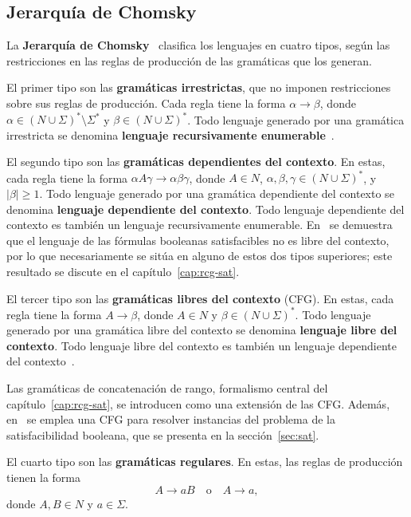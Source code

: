 \subsection{Jerarquía de Chomsky}

La \textbf{Jerarquía de Chomsky}~\cite{hunter2020chomsky} clasifica los
lenguajes en cuatro tipos, según las restricciones en las reglas de
producción de las gramáticas que los generan.

El primer tipo son las \textbf{gramáticas irrestrictas}, que no imponen
restricciones sobre sus reglas de producción. Cada regla tiene la forma
$\alpha \to \beta$, donde $\alpha \in (N \cup \Sigma)^* \setminus \Sigma^*$
y $\beta \in (N \cup \Sigma)^*$. Todo lenguaje generado por una gramática
irrestricta se denomina \textbf{lenguaje recursivamente
enumerable}~\cite{hopcroft2006introduction}.

El segundo tipo son las \textbf{gramáticas dependientes del contexto}.
En estas, cada regla tiene la forma $\alpha A \gamma \to \alpha \beta \gamma$,
donde $A \in N$, $\alpha, \beta, \gamma \in (N \cup \Sigma)^*$, y
$|\beta| \ge 1$. Todo lenguaje generado por una gramática dependiente
del contexto se denomina \textbf{lenguaje dependiente del contexto}.
Todo lenguaje dependiente del contexto es también un lenguaje
recursivamente enumerable. En~\cite{gomezmolina2025} se demuestra que
el lenguaje de las fórmulas booleanas satisfacibles no es libre del
contexto, por lo que necesariamente se sitúa en alguno de estos dos
tipos superiores; este resultado se discute en el
capítulo~\ref{cap:rcg-sat}.

El tercer tipo son las \textbf{gramáticas libres del contexto} (CFG).
En estas, cada regla tiene la forma $A \to \beta$, donde $A \in N$ y
$\beta \in (N \cup \Sigma)^*$. Todo lenguaje generado por una gramática
libre del contexto se denomina \textbf{lenguaje libre del contexto}.
Todo lenguaje libre del contexto es también un lenguaje dependiente del
contexto~\cite{hopcroft2006introduction}.

Las gramáticas de concatenación de rango, formalismo central del
capítulo~\ref{cap:rcg-sat}, se introducen como una extensión de las
CFG. Además, en~\cite{fernandezarias2007} se emplea una CFG para
resolver instancias del problema de la satisfacibilidad booleana, que
se presenta en la sección~\ref{sec:sat}.

El cuarto tipo son las \textbf{gramáticas regulares}. En estas, las
reglas de producción tienen la forma
\[
  A \to aB \quad \text{o} \quad A \to a,
\]
donde $A, B \in N$ y $a \in \Sigma$.

